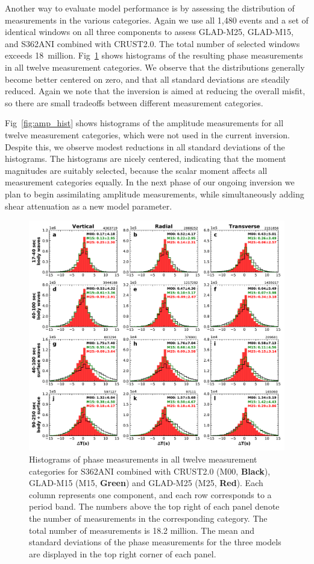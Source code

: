 \documentclass[extra,mreferee]{gji}
\begin{document}
Another way to evaluate model performance is by assessing the distribution
of measurements in the various categories.
Again we use all 1,480 events and a set of identical windows on all three components
to assess GLAD-M25, GLAD-M15, and S362ANI combined with CRUST2.0.
The total number of selected windows exceeds 18~million.
Fig~\ref{fig:phase_hist} shows histograms of the resulting phase
measurements in all twelve measurement categories.
We observe that the distributions generally become better centered on zero,
and that all standard deviations are steadily reduced.
Again we note that the inversion is aimed at reducing the overall misfit,
so there are small tradeoffs between different measurement categories.

Fig~\ref{fig:amp_hist} shows histograms of the amplitude
measurements for all twelve measurement categories,
which were not used in the current inversion.
Despite this,
we observe modest reductions in all standard deviations of the histograms.
The histograms are nicely centered, indicating that the moment magnitudes are suitably selected, because the scalar moment affects all measurement categories equally.
In the next phase of our ongoing inversion we plan to begin assimilating amplitude measurements,
while simultaneously adding shear attenuation as a new model parameter.

\begin{figure}
  \centering
  \includegraphics[width=\textwidth]{figures/dt_histogram.pdf}
  \caption{Histograms of phase measurements in all twelve measurement categories for S362ANI combined with CRUST2.0 (M00, \textbf{Black}), GLAD-M15 (M15, \textbf{{\color{ForestGreen} Green}}) and GLAD-M25 (M25, \textbf{{\color{Red} Red}}).
  Each column represents one component, and each row corresponds to a period band.
  The numbers above the top right of each panel denote the number of measurements in the corresponding category.
  The total number of measurements is 18.2 million.
  The mean and standard deviations of the phase measurements for the three models are displayed in the top right corner of each panel.}
  \label{fig:phase_hist}
\end{figure}
\end{document}
